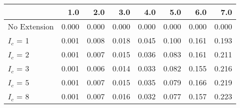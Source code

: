 \begin{tabular}{lrrrrrrr}
\toprule
{} &   1.0 &   2.0 &   3.0 &   4.0 &   5.0 &   6.0 &   7.0 \\
\midrule
No Extension & 0.000 & 0.000 & 0.000 & 0.000 & 0.000 & 0.000 & 0.000 \\
$I_c$ = 1    & 0.001 & 0.008 & 0.018 & 0.045 & 0.100 & 0.161 & 0.193 \\
$I_c$ = 2    & 0.001 & 0.007 & 0.015 & 0.036 & 0.083 & 0.161 & 0.211 \\
$I_c$ = 3    & 0.001 & 0.006 & 0.014 & 0.033 & 0.082 & 0.155 & 0.216 \\
$I_c$ = 5    & 0.001 & 0.007 & 0.015 & 0.035 & 0.079 & 0.166 & 0.219 \\
$I_c$ = 8    & 0.001 & 0.007 & 0.016 & 0.032 & 0.077 & 0.157 & 0.223 \\
\bottomrule
\end{tabular}
